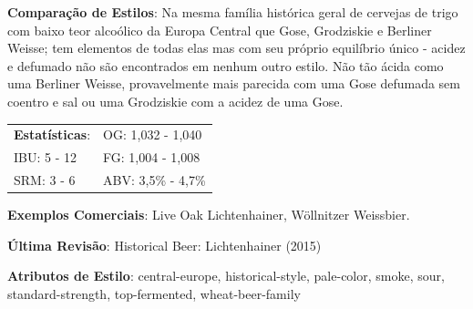 \textbf{Comparação de Estilos}: Na mesma família histórica geral de cervejas de trigo com baixo teor alcoólico da Europa Central que Gose, Grodziskie e Berliner Weisse; tem elementos de todas elas mas com seu próprio equilíbrio único - acidez e defumado não são encontrados em nenhum outro estilo. Não tão ácida como uma Berliner Weisse, provavelmente mais parecida com uma Gose defumada sem coentro e sal ou uma Grodziskie com a acidez de uma Gose.

\begin{tabular}{@{}p{35mm}p{35mm}@{}}
  \textbf{Estatísticas}: & OG: 1,032 - 1,040  \\
  IBU: 5 - 12  & FG: 1,004 - 1,008  \\
  SRM: 3 - 6 & ABV: 3,5\% - 4,7\%
\end{tabular}

\textbf{Exemplos Comerciais}: Live Oak Lichtenhainer, Wöllnitzer Weissbier.

\textbf{Última Revisão}: Historical Beer: Lichtenhainer (2015)

\textbf{Atributos de Estilo}: central-europe, historical-style, pale-color, smoke, sour, standard-strength, top-fermented, wheat-beer-family